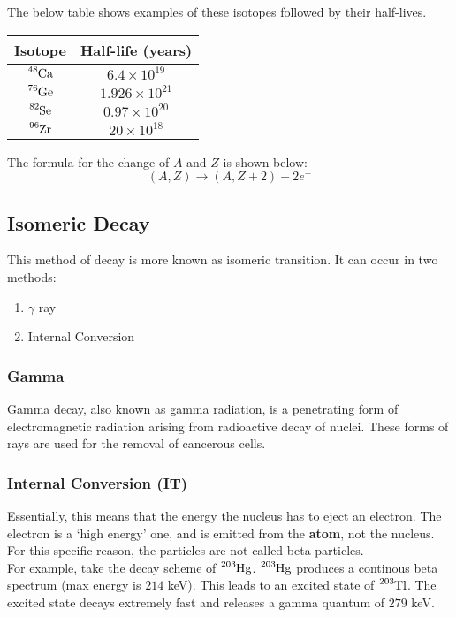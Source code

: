 \documentclass{article}
\begin{document}
\begin{multicols*}{2}
    The below table shows examples of these isotopes followed by their half-lives.\\
    
    \begin{tabular}{|c|c|}
      \hline
      \textbf{Isotope} & \textbf{Half-life (years)} \\
      \hline
      $\ce{^{48}Ca}$ & $6.4 \times 10^{19}$ \\
      $\ce{^{76}Ge}$ & $1.926 \times 10^{21}$ \\
      $\ce{^{82}Se}$ & $0.97 \times 10^{20}$ \\
      $\ce{^{96}Zr}$ & $20 \times 10^{18}$ \\
      \hline
    \end{tabular}

    The formula for the change of $A$ and $Z$ is shown below:
    \[
      \left(A, Z\right) \rightarrow \left(A, Z + 2\right) + 2e^{-}
    \]


    \subsection{Isomeric Decay}
    This method of decay is more known as isomeric transition. It can occur
    in two methods:
    \begin{enumerate}
      \item $\gamma$ ray
      \item Internal Conversion
    \end{enumerate}
    \subsubsection{Gamma}
    Gamma decay, also known as gamma radiation, is a penetrating form of
    electromagnetic radiation arising from radioactive decay of nuclei. These
    forms of rays are used for the removal of cancerous cells.
    
    \subsubsection{Internal Conversion (IT)}
    Essentially, this means that the energy the nucleus has to eject an electron.
    The electron is a `high energy' one, and is emitted from the \textbf{atom},
    not the nucleus. For this specific reason, the particles are not called
    beta particles.\\

    For example, take the decay scheme of $\ce{^{203}Hg}$. $\ce{^{203}Hg}$ produces
    a continous beta spectrum (max energy is $214$ keV). This leads to an excited
    state of $\ce{^{203}Tl}$. The excited state decays extremely fast and releases
    a gamma quantum of $279$ keV.


\end{multicols*}
\end{document}
